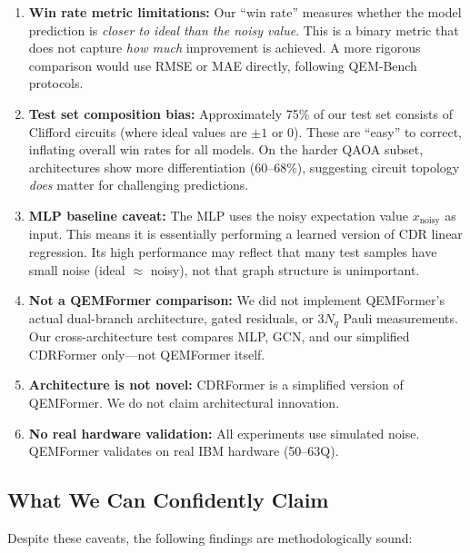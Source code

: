 \documentclass[11pt, a4paper]{article}
\begin{document}
\begin{enumerate}
    \item \textbf{Win rate metric limitations:} Our ``win rate'' measures
    whether the model prediction is \emph{closer to ideal than the noisy
    value}. This is a binary metric that does not capture \emph{how much}
    improvement is achieved. A more rigorous comparison would use RMSE
    or MAE directly, following QEM-Bench protocols.
    
    \item \textbf{Test set composition bias:} Approximately 75\% of our
    test set consists of Clifford circuits (where ideal values are
    $\pm 1$ or $0$). These are ``easy'' to correct, inflating overall
    win rates for all models. On the harder QAOA subset, architectures
    show more differentiation (60--68\%), suggesting circuit topology
    \emph{does} matter for challenging predictions.
    
    \item \textbf{MLP baseline caveat:} The MLP uses the noisy expectation
    value $x_{\text{noisy}}$ as input. This means it is essentially
    performing a learned version of CDR linear regression. Its high
    performance may reflect that many test samples have small noise
    (ideal $\approx$ noisy), not that graph structure is unimportant.
    
    \item \textbf{Not a QEMFormer comparison:} We did not implement
    QEMFormer's actual dual-branch architecture, gated residuals, or
    $3N_q$ Pauli measurements. Our cross-architecture test compares
    MLP, GCN, and our simplified CDRFormer only---not QEMFormer itself.
    
    \item \textbf{Architecture is not novel:} CDRFormer is a simplified
    version of QEMFormer. We do not claim architectural innovation.
    
    \item \textbf{No real hardware validation:} All experiments use
    simulated noise. QEMFormer validates on real IBM hardware (50--63Q).
\end{enumerate}

\subsection{What We Can Confidently Claim}

Despite these caveats, the following findings are methodologically sound:
\end{document}
